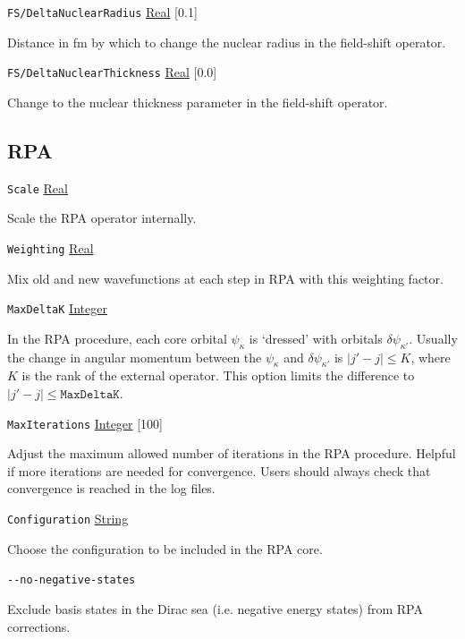 \documentclass{report}
\begin{document}
\texttt{FS/DeltaNuclearRadius} \uline{Real} [0.1]
\begin{adjustwidth}{1cm}{}
Distance in fm by which to change the nuclear radius in the field-shift operator. 
\end{adjustwidth}

\texttt{FS/DeltaNuclearThickness} \uline{Real} [0.0]
\begin{adjustwidth}{1cm}{}
Change to the nuclear thickness parameter in the field-shift operator.
\end{adjustwidth}

\subsection{RPA}

\texttt{Scale} \uline{Real}
\begin{adjustwidth}{1cm}{}
Scale the RPA operator internally.
\end{adjustwidth}

\texttt{Weighting} \uline{Real}
\begin{adjustwidth}{1cm}{}
Mix old and new wavefunctions at each step in RPA with this weighting factor.
\end{adjustwidth}

\texttt{MaxDeltaK} \uline{Integer}
\begin{adjustwidth}{1cm}{}
	In the RPA procedure, each core orbital $\psi_\kappa$ is `dressed' with orbitals $\delta\psi_{\kappa'}$. Usually the change in angular momentum between the $\psi_\kappa$ and $\delta\psi_{\kappa'}$ is $|j' - j| \leq K$, where $K$ is the rank of the external operator.
	This option limits the difference to $|j' - j|\leq \texttt{MaxDeltaK}$.
\end{adjustwidth}

\texttt{MaxIterations} \uline{Integer} [100]
\begin{adjustwidth}{1cm}{}
	Adjust the maximum allowed number of iterations in the RPA procedure. Helpful if more iterations are needed for convergence. Users should always check that convergence is reached in the log files.
\end{adjustwidth}

\texttt{Configuration} \uline{String}
\begin{adjustwidth}{1cm}{}
	Choose the configuration to be included in the RPA core.
\end{adjustwidth}

\texttt{{-}{-}no-negative-states}
\begin{adjustwidth}{1cm}{}
Exclude basis states in the Dirac sea (i.e. negative energy states) from RPA corrections.
\end{adjustwidth}
\end{document}
